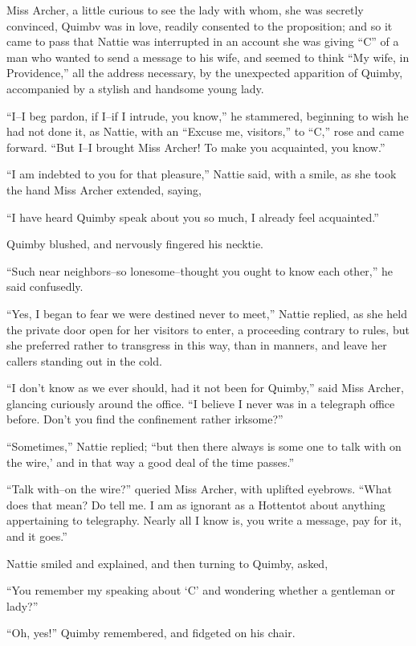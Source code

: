 Miss Archer, a little curious to see the lady with whom, she was
secretly convinced, Quimbv was in love, readily consented to the
proposition; and so it came to pass that Nattie was interrupted in an
account she was giving ``C'' of a man who wanted to send a message to his
wife, and seemed to think ``My wife, in Providence,'' all the address
necessary, by the unexpected apparition of Quimby, accompanied by a
stylish and handsome young lady.

``I--I beg pardon, if I--if I intrude, you know,'' he stammered, beginning
to wish he had not done it, as Nattie, with an ``Excuse me, visitors,'' to
``C,'' rose and came forward. ``But I--I brought Miss Archer! To make you
acquainted, you know.''

``I am indebted to you for that pleasure,'' Nattie said, with a smile, as
she took the hand Miss Archer extended, saying,

``I have heard Quimby speak about you so much, I already feel
acquainted.''

Quimby blushed, and nervously fingered his necktie.

``Such near neighbors--so lonesome--thought you ought to know each
other,'' he said confusedly.

``Yes, I began to fear we were destined never to meet,'' Nattie replied,
as she held the private door open for her visitors to enter, a
proceeding contrary to rules, but she preferred rather to transgress in
this way, than in manners, and leave her callers standing out in the
cold.

``I don't know as we ever should, had it not been for Quimby,'' said Miss
Archer, glancing curiously around the office. ``I believe I never was in
a telegraph office before. Don't you find the confinement rather
irksome?''

``Sometimes,'' Nattie replied; ``but then there always is some one to talk
with on the wire,' and in that way a good deal of the time passes.''

``Talk with--on the wire?'' queried Miss Archer, with uplifted eyebrows.
``What does that mean? Do tell me. I am as ignorant as a Hottentot about
anything appertaining to telegraphy. Nearly all I know is, you write a
message, pay for it, and it goes.''

Nattie smiled and explained, and then turning to Quimby, asked,

``You remember my speaking about `C' and wondering whether a gentleman or
lady?''

``Oh, yes!'' Quimby remembered, and fidgeted on his chair.


